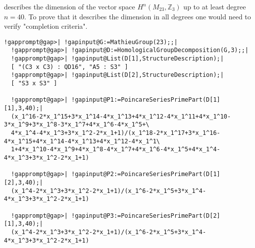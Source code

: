 \documentclass[a4paper,11pt]{report}
\begin{document}
{{describes the dimension of the vector space $H^n(M_{23},\mathbb Z_3)$ up to at least degree $n=40$. To prove that it describes the dimension in all degrees one would need to
verify "completion criteria". 
\begin{Verbatim}[commandchars=!@|,fontsize=\small,frame=single,label=Example]
  !gapprompt@gap>| !gapinput@G:=MathieuGroup(23);;|
  !gapprompt@gap>| !gapinput@D:=HomologicalGroupDecomposition(G,3);;|
  !gapprompt@gap>| !gapinput@List(D[1],StructureDescription);|
  [ "(C3 x C3) : QD16", "A5 : S3" ]
  !gapprompt@gap>| !gapinput@List(D[2],StructureDescription);|
  [ "S3 x S3" ]
  
  !gapprompt@gap>| !gapinput@P1:=PoincareSeriesPrimePart(D[1][1],3,40);|
  (x_1^16-2*x_1^15+3*x_1^14-4*x_1^13+4*x_1^12-4*x_1^11+4*x_1^10-3*x_1^9+3*x_1^8-3*x_1^7+4*x_1^6-4*x_1^5+\
  4*x_1^4-4*x_1^3+3*x_1^2-2*x_1+1)/(x_1^18-2*x_1^17+3*x_1^16-4*x_1^15+4*x_1^14-4*x_1^13+4*x_1^12-4*x_1^1\
  1+4*x_1^10-4*x_1^9+4*x_1^8-4*x_1^7+4*x_1^6-4*x_1^5+4*x_1^4-4*x_1^3+3*x_1^2-2*x_1+1)
  
  !gapprompt@gap>| !gapinput@P2:=PoincareSeriesPrimePart(D[1][2],3,40);|
  (x_1^4-2*x_1^3+3*x_1^2-2*x_1+1)/(x_1^6-2*x_1^5+3*x_1^4-4*x_1^3+3*x_1^2-2*x_1+1)
  
  !gapprompt@gap>| !gapinput@P3:=PoincareSeriesPrimePart(D[2][1],3,40);|
  (x_1^4-2*x_1^3+3*x_1^2-2*x_1+1)/(x_1^6-2*x_1^5+3*x_1^4-4*x_1^3+3*x_1^2-2*x_1+1)
  
\end{Verbatim}
 }

 }

 
\end{document}

